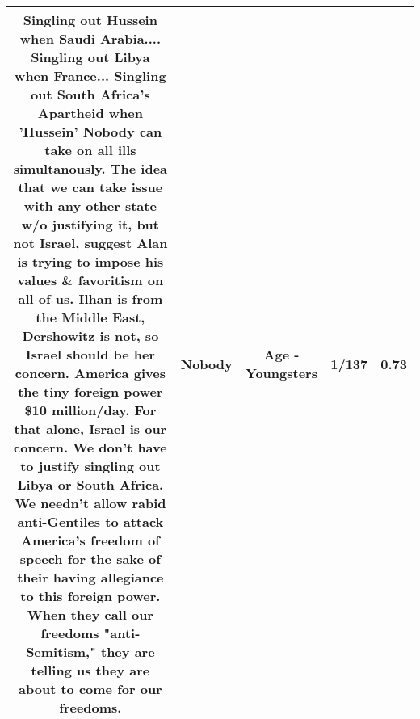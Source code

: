 \documentclass[11pt]{article}
\newlength\mylength
\begin{document}
\begin{center}
\begin{longtable}{|C{.65\mylength}|C{.30\mylength}|C{.12\mylength}|C{.12\mylength}|C{.12\mylength}|}
  \small Singling out Hussein when Saudi Arabia.... Singling out Libya when France... Singling out South Africa's Apartheid when 'Hussein'  \textbf{Nobody} can take on all ills simultanously. The idea that we can take issue with any other state w/o justifying it, but not Israel, suggest Alan is trying to impose his values \& favoritism on all of us. Ilhan is from the Middle East, Dershowitz is not, so Israel should be her concern. America gives the tiny foreign power \$10 million/day. For that alone, Israel is our concern. We don't have to justify singling out Libya or South Africa. We needn't allow rabid anti-Gentiles to attack America's freedom of speech for the sake of their having allegiance to this foreign power. When they call our freedoms "anti-Semitism," they are telling us they are about to come for our freedoms.\normalsize   & Nobody & Age - Youngsters & 1/137 & 0.73 \\  \hline

\end{longtable}
\end{center}
\end{document}
